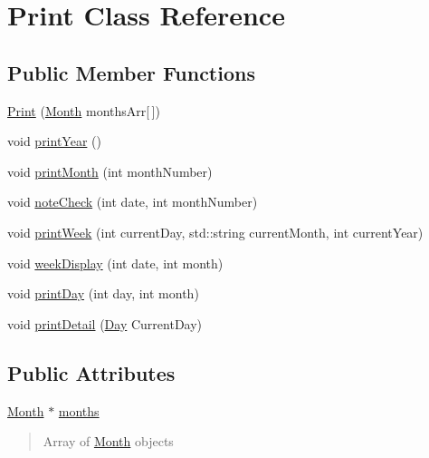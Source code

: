 \hypertarget{class_print}{}\section{Print Class Reference}
\label{class_print}
\subsection*{Public Member Functions}
\begin{DoxyCompactItemize}
\item 
\hyperlink{class_print_a7b9e4716438a4d6003fb53d740172463}{Print} (\hyperlink{class_month}{Month} months\+Arr\mbox{[}$\,$\mbox{]})
\item 
void \hyperlink{class_print_ab38ff940d0abba39ec72485ba3e16259}{print\+Year} ()
\item 
void \hyperlink{class_print_a783042d8e22a1b8a0b81bbcbc9bb03f0}{print\+Month} (int month\+Number)
\item 
void \hyperlink{class_print_ae528ed0fc9fe31222a1fcd33fe58d45b}{note\+Check} (int date, int month\+Number)
\item 
void \hyperlink{class_print_a5480160313e90ae75d51255bd20a54fe}{print\+Week} (int current\+Day, std\+::string current\+Month, int current\+Year)
\item 
void \hyperlink{class_print_a7013b300e4a36e6cd2fa8c68eab71892}{week\+Display} (int date, int month)
\item 
void \hyperlink{class_print_adcc0b985904ceb75634e3bb0b156d033}{print\+Day} (int day, int month)
\item 
void \hyperlink{class_print_a4bafeff01d0859e9ebf977abbfe31f9c}{print\+Detail} (\hyperlink{class_day}{Day} Current\+Day)
\end{DoxyCompactItemize}
\subsection*{Public Attributes}
\begin{DoxyCompactItemize}
\item 
\hyperlink{class_month}{Month} $\ast$ \hyperlink{class_print_a9c8bb58b547f6ffd71b735b6bb0072b1}{months}\hypertarget{class_print_a9c8bb58b547f6ffd71b735b6bb0072b1}{}\label{class_print_a9c8bb58b547f6ffd71b735b6bb0072b1}

\begin{DoxyCompactList}\small\item\em \begin{quote}
Array of \hyperlink{class_month}{Month} objects \end{quote}
\end{DoxyCompactList}\end{DoxyCompactItemize}


